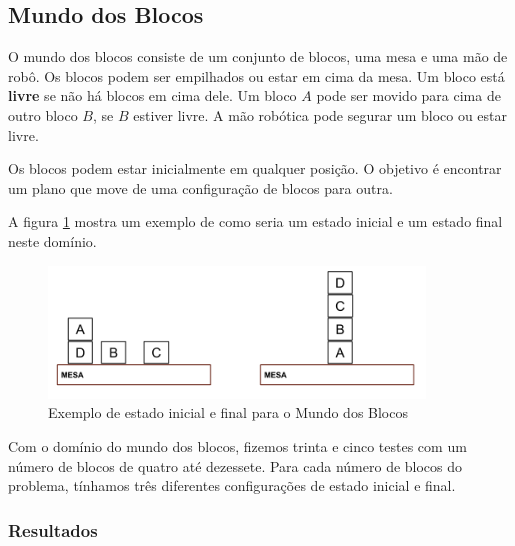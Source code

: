 \subsection{Mundo dos Blocos}\label{problemas:blocos}

O mundo dos blocos consiste de um conjunto de blocos, uma mesa e uma mão de robô. Os blocos podem ser empilhados ou estar em cima da mesa. Um bloco está \textbf{livre} se não há blocos em cima dele. Um bloco $A$ pode ser movido para cima de outro bloco $B$, se $B$ estiver livre. A mão robótica pode segurar um bloco ou estar livre.

Os blocos podem estar inicialmente em qualquer posição. O objetivo é encontrar um plano que move de uma configuração de blocos para outra.

A figura \ref{fig:blocos} mostra um exemplo de como seria um estado inicial e um estado final neste domínio.

\begin{figure}[H]%
  \centering
  \includegraphics[width=10cm]{figures/blocos.png}
  \caption{Exemplo de estado inicial e final para o Mundo dos Blocos}
  \label{fig:blocos}
\end{figure}

Com o domínio do mundo dos blocos, fizemos trinta e cinco testes com um número de blocos de quatro até dezessete. Para cada número de blocos do problema, tínhamos três diferentes configurações de estado inicial e final.

\subsubsection{Resultados}\label{problemas:blocos:resultados}

